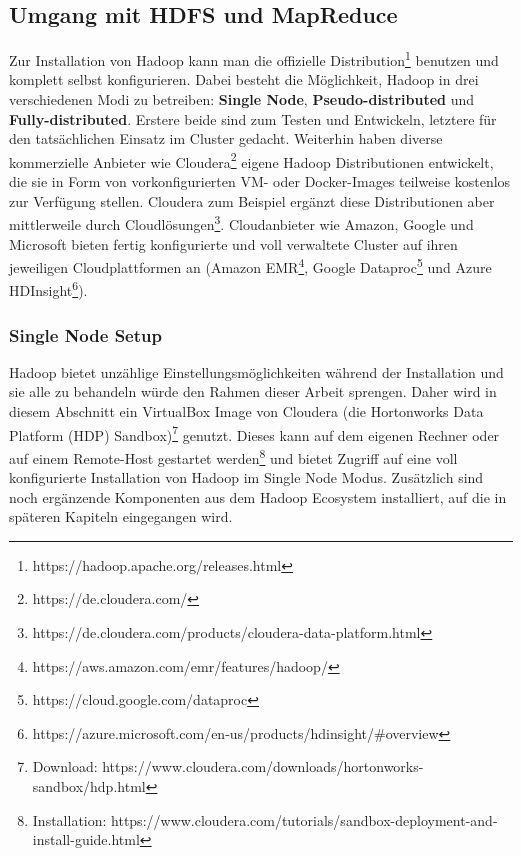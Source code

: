 \subsection{Umgang mit HDFS und MapReduce}
Zur Installation von Hadoop kann man die offizielle Distribution\footnote{https://hadoop.apache.org/releases.html} benutzen und komplett selbst konfigurieren. Dabei besteht die Möglichkeit, Hadoop in drei verschiedenen Modi zu betreiben: \textbf{Single Node}, \textbf{Pseudo-distributed} und \textbf{Fully-distributed}. Erstere beide sind zum Testen und Entwickeln, letztere für den tatsächlichen Einsatz im Cluster gedacht\cite[vgl.][Kap. 3.4]{freiknecht_big_2018}.
Weiterhin haben diverse kommerzielle Anbieter wie Cloudera\footnote{https://de.cloudera.com/} eigene Hadoop Distributionen entwickelt, die sie in Form von vorkonfigurierten VM- oder Docker-Images teilweise kostenlos zur Verfügung stellen. Cloudera zum Beispiel ergänzt diese Distributionen aber mittlerweile durch Cloudlösungen\footnote{https://de.cloudera.com/products/cloudera-data-platform.html}.   
Cloudanbieter wie Amazon, Google und Microsoft bieten fertig konfigurierte und voll verwaltete Cluster auf ihren jeweiligen Cloudplattformen an (Amazon EMR\footnote{https://aws.amazon.com/emr/features/hadoop/}, Google Dataproc\footnote{https://cloud.google.com/dataproc} und Azure HDInsight\footnote{https://azure.microsoft.com/en-us/products/hdinsight/\#overview}). 

\subsubsection*{Single Node Setup}
Hadoop bietet unzählige Einstellungsmöglichkeiten während der Installation und sie alle zu behandeln würde den Rahmen dieser Arbeit sprengen. Daher wird in diesem Abschnitt ein VirtualBox Image von Cloudera (die Hortonworks Data Platform (HDP) Sandbox)\footnote{Download: https://www.cloudera.com/downloads/hortonworks-sandbox/hdp.html} genutzt. Dieses kann auf dem eigenen Rechner oder auf einem Remote-Host gestartet werden\footnote{Installation: https://www.cloudera.com/tutorials/sandbox-deployment-and-install-guide.html} und bietet Zugriff auf eine voll konfigurierte Installation von Hadoop im Single Node Modus. Zusätzlich sind noch ergänzende Komponenten aus dem Hadoop Ecosystem installiert, auf die in späteren Kapiteln eingegangen wird.

